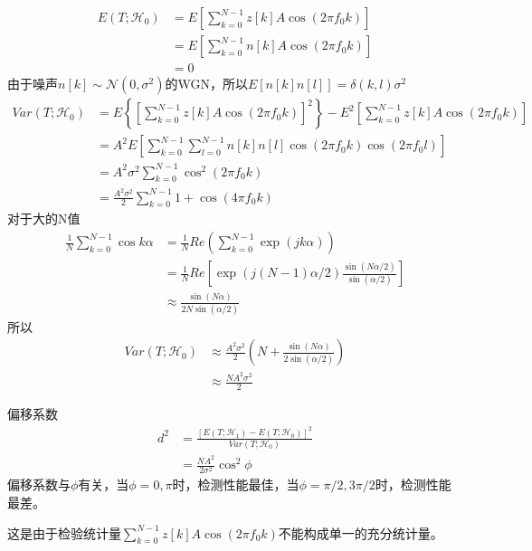 \documentclass[fontset=windows]{article}
\numberwithin{figure}{section}
\begin{document}
\begin{align*}
	E(T;\mathcal{H}_0)
	 & =E\left[\sum_{k=0}^{N-1}z[k]A\cos (2\pi f_0 k)\right] \\
	 & =E\left[\sum_{k=0}^{N-1}n[k]A\cos (2\pi f_0 k)\right] \\
	 & =0
\end{align*}
由于噪声\(n[k]\sim\mathcal{N}(0,\sigma^2)\)的WGN，所以\(E\left[n[k]n[l]\right]=\delta(k,l)\sigma^2\)
\begin{align*}
	Var(T;\mathcal{H}_0)
	 & =E\left\{\left[\sum_{k=0}^{N-1}z[k]A\cos (2\pi f_0 k)\right]^2 \right\}-E^2\left[\sum_{k=0}^{N-1}z[k]A\cos (2\pi f_0 k)\right] \\
	 & =A^2E\left[\sum_{k=0}^{N-1}\sum_{l=0}^{N-1}n[k]n[l]\cos (2\pi f_0 k)\cos (2\pi f_0 l)\right]                                   \\
	 & =A^2\sigma^2\sum_{k=0}^{N-1}\cos^2 (2\pi f_0 k)                                                                                \\
	 & =\frac{A^2\sigma^2}{2}\sum_{k=0}^{N-1}1+\cos (4\pi f_0 k)
\end{align*}
对于大的N值
\begin{align*}
	\frac{1}{N}\sum_{k=0}^{N-1}\cos k\alpha
	 & =\frac{1}{N}Re\left(\sum_{k=0}^{N-1}\exp(jk\alpha)\right)                             \\
	 & =\frac{1}{N}Re\left[\exp(j(N-1)\alpha/2)\frac{\sin(N\alpha/2)}{\sin(\alpha/2)}\right] \\
	 & \approx \frac{\sin(N\alpha)}{2N\sin(\alpha/2)}
\end{align*}
所以
\begin{align*}
	Var(T;\mathcal{H}_0)
	 & \approx \frac{A^2\sigma^2}{2}(N+\frac{\sin(N\alpha)}{2\sin(\alpha/2)}) \\
	 & \approx\frac{NA^2\sigma^2}{2}
\end{align*}

偏移系数
\begin{align*}
	d^2
	 & =\frac{\left[E(T;\mathcal{H}_1)-E(T;\mathcal{H}_0)\right]^2}{Var(T;\mathcal{H}_0)} \\
	 & =\frac{NA^2}{2\sigma^2}\cos^2 \phi
\end{align*}
偏移系数与\(\phi\)有关，当\(\phi=0,\pi\)时，检测性能最佳，当\(\phi=\pi/2,3\pi/2\)时，检测性能最差。

这是由于检验统计量\(\sum_{k=0}^{N-1}z[k]A\cos(2\pi f_0 k)\)不能构成单一的充分统计量。
\end{document}
